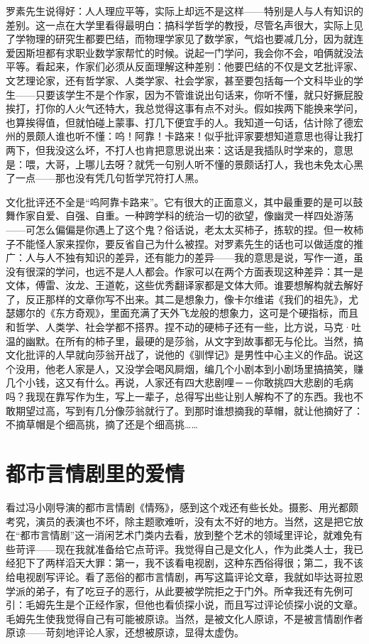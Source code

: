 罗素先生说得好：人人理应平等，实际上却远不是这样——特别是人与人有知识的差别。这一点在大学里看得最明白：搞科学哲学的教授，尽管名声很大，实际上见了学物理的研究生都要巴结，而物理学家见了数学家，气焰也要减几分，因为就连爱因斯坦都有求职业数学家帮忙的时候。说起一门学问，我会你不会，咱俩就没法平等。看起来，作家们必须从反面理解这种差别：他要巴结的不仅是文艺批评家、文艺理论家，还有哲学家、人类学家、社会学家，甚至要包括每一个文科毕业的学生——只要该学生不是个作家，因为不管谁说出句话来，你听不懂，就只好撅屁股挨打，打你的人火气还特大，我总觉得这事有点不对头。假如挨两下能换来学问，也算挨得值，但就怕碰上蒙事、打几下便宜手的人。我知道一句话，估计除了德宏州的景颇人谁也听不懂：呜！阿靠！卡路来！似乎批评家要想知道意思也得让我打两下，但我没这么坏，不打人也肯把意思说出来：这话是我插队时学来的，意思是：喂，大哥，上哪儿去呀？就凭一句别人听不懂的景颇话打人，我也未免太心黑了一点——那也没有凭几句哲学咒符打人黑。 

文化批评还不全是“呜阿靠卡路来”。它有很大的正面意义，其中最重要的是可以鼓舞作家自爱、自强、自重。一种跨学科的统治一切的欲望，像幽灵一样四处游荡——可怎么偏偏是你遇上了这个鬼？俗话说，老太太买柿子，拣软的捏。但一枚柿子不能怪人家来捏你，要反省自己为什么被捏。对罗素先生的话也可以做适度的推广：人与人不独有知识的差异，还有能力的差异——我的意思是说，写作一道，虽没有很深的学问，也远不是人人都会。作家可以在两个方面表现这种差异：其一是文体，傅雷、汝龙、王道乾，这些优秀翻译家都是文体大师。谁要想解构就去解好了，反正那样的文章你写不出来。其二是想象力，像卡尔维诺《我们的祖先》，尤瑟娜尔的《东方奇观》，里面充满了天外飞龙般的想象力，这可是个硬指标，而且和哲学、人类学、社会学都不搭界。捏不动的硬柿子还有一些，比方说，马克·吐温的幽默。在所有的柿子里，最硬的是莎翁，从文字到故事都无与伦比。当然，搞文化批评的人早就向莎翁开战了，说他的《驯悍记》是男性中心主义的作品。说这个没用，他老人家是人，又没学会喝风屙烟，编几个小剧本到小剧场里搞搞笑，赚几个小钱，这又有什么。再说，人家还有四大悲剧哩－－你敢挑四大悲剧的毛病吗？我现在靠写作为生，写上一辈子，总得写出些让别人解构不了的东西。我也不敢期望过高，写到有几分像莎翁就行了。到那时谁想摘我的草帽，就让他摘好了：不摘草帽是个细高挑，摘了还是个细高挑……

\chapter{都市言情剧里的爱情}

看过冯小刚导演的都市言情剧《情殇》，感到这个戏还有些长处。摄影、用光都颇考究，演员的表演也不坏，除主题歌难听，没有太不好的地方。当然，这是把它放在“都市言情剧”这一消闲艺术门类内去看，放到整个艺术的领域里评论，就难免有些苛评——现在我就准备给它点苛评。我觉得自己是文化人，作为此类人士，我已经犯下了两样滔天大罪：第一，我不该看电视剧，这种东西俗得很；第二，我不该给电视剧写评论。看了恶俗的都市言情剧，再写这篇评论文章，我就如毕达哥拉恩学派的弟子，有了吃豆子的恶行，从此要被学院拒之于门外。所幸我还有先例可引：毛姆先生是个正经作家，但他也看侦探小说，而且写过评论侦探小说的文章。毛姆先生使我觉得自己有可能被原谅。当然，是被文化人原谅，不是被言情剧作者原谅——苛刻地评论人家，还想被原谅，显得太虚伪。 

